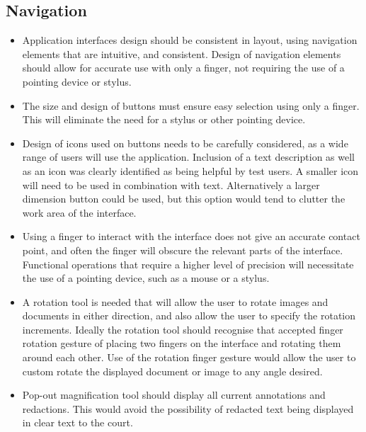 \subsection{Navigation}
\begin{itemize}
     \item Application interfaces design should be consistent in layout, using navigation elements that are intuitive, and consistent. Design of navigation elements should allow for accurate use with only a finger, not requiring the use of a pointing device or stylus.
    \item The size and design of buttons must ensure easy selection using only a finger. This will eliminate the need for a stylus or other pointing device.
    \item Design of icons used on buttons needs to be carefully considered, as a wide range of users will use the application. Inclusion of a text description as well as an icon was clearly identified as being helpful by test users. A smaller icon will need to be used in combination with text. Alternatively a larger dimension button could be used, but this option would tend to clutter the work area of the interface.
    \item Using a finger to interact with the interface does not give an accurate contact point, and often the finger will obscure the relevant parts of the interface. Functional operations that require a higher level of precision will necessitate the use of a pointing device, such as a mouse or a stylus.
    \item A rotation tool is needed that will allow the user to rotate images and documents in either direction, and also allow the user to specify the rotation increments. Ideally the rotation tool should recognise that accepted finger rotation gesture of placing two fingers on the interface and rotating them around each other. Use of the rotation finger gesture would allow the user to custom rotate the displayed document or image to any angle desired.
    \item Pop-out magnification tool should display all current annotations and redactions. This would avoid the possibility of redacted text being displayed in clear text to the court.
\end{itemize}

